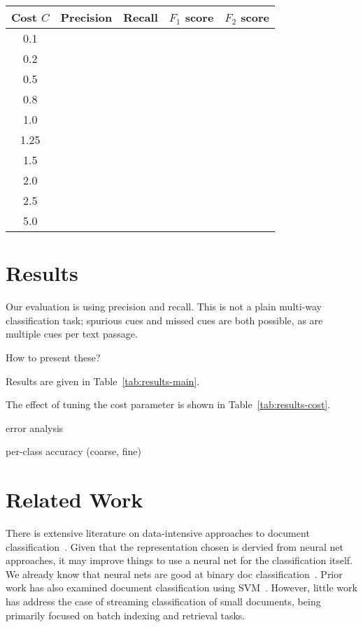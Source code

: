 \documentclass[10pt,a4paper]{article}
\begin{document}
\begin{table*}
\centering
\footnotesize
\begin{tabular}{c|cccc}
\hline
{\bf Cost $C$} & {\bf Precision} & {\bf Recall} & {\bf $F_1$ score} & {\bf $F_2$ score} \\
\hline
0.1 &&&& \\
0.2 &&&& \\
0.5 &&&& \\
0.8 &&&& \\
1.0 &&&& \\
1.25 &&&& \\
1.5 &&&& \\
2.0 &&&& \\
2.5 &&&& \\
5.0 &&&& \\
\hline
\end{tabular}
\label{tab:results-cost}
\caption{Modulating the cost function to reduce false positives; SVM with s2v representation}
\end{table*}


\section{Results}

Our evaluation is using precision and recall.
This is not a plain multi-way classification task; spurious cues and missed cues are both possible, as are multiple cues per text passage.

How to present these?

Results are given in Table~\ref{tab:results-main}.

The effect of tuning the cost parameter is shown in Table~\ref{tab:results-cost}.

error analysis

per-class accuracy (coarse, fine)


\section{Related Work}

There is extensive literature on data-intensive approaches to document classification~\cite{sebastiani2002machine}.
Given that the representation chosen is dervied from neural net approaches, it may improve things to use a neural net for the classification itself.
We already know that neural nets are good at binary doc classification~\cite{derczynski2006machine}.
Prior work has also examined document classification using SVM~\cite{isa2008text}.
However, little work has address the case of streaming classification of small documents, being primarily focused on batch indexing and retrieval tasks.
\end{document}
